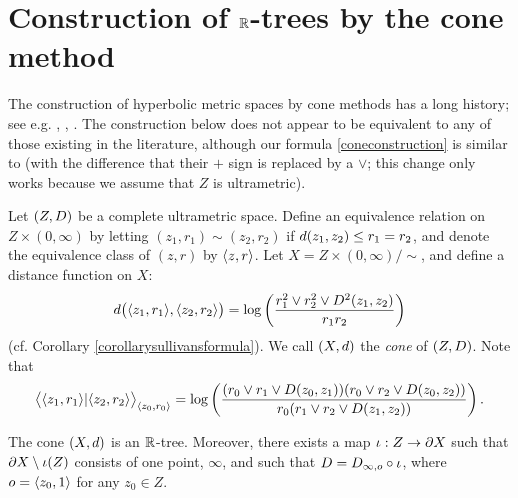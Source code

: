 \section{Construction of $\R$-trees by the cone method}
\label{subsectionconeconstruction}
The construction of hyperbolic metric spaces by cone methods has a long history; see e.g. \cite[1.8.A.(b)]{Gromov3}, \cite{TrotsenkoVaisala}, \cite[]{BonkSchramm}. The construction below does not appear to be equivalent to any of those existing in the literature, although our formula \eqref{coneconstruction} is similar to \cite[7.1]{BonkSchramm} (with the difference that their $+$ sign is replaced by a $\vee$; this change only works because we assume that $Z$ is ultrametric).

Let $(Z,D)$ be a complete ultrametric space. Define an equivalence relation on $Z\times (0,\infty)$ by letting $(z_1,r_1) \sim (z_2,r_2)$ if $d(z_1,z_2)\leq r_1 = r_2$, and denote the equivalence class of $(z,r)$ by $\langle z,r\rangle$. Let $X = Z\times (0,\infty)/\sim$, and define a distance function on $X$:
\begin{equation}
\label{coneconstruction}
d\big(\langle z_1,r_1\rangle,\langle z_2,r_2\rangle\big) = \log\left(\frac{r_1^2\vee r_2^2\vee D^2(z_1,z_2)}{r_1 r_2}\right)
\end{equation}
(cf. Corollary \ref{corollarysullivansformula}). We call $(X,d)$ the \emph{cone} of $(Z,D)$. Note that
\begin{equation}
\label{coneconstructiongromov}
\big\langle \langle z_1,r_1\rangle | \langle z_2,r_2\rangle\big\rangle_{\langle z_0,r_0\rangle} = \log\left(\frac{(r_0\vee r_1\vee D(z_0,z_1))(r_0\vee r_2\vee D(z_0,z_2))}{r_0(r_1\vee r_2\vee D(z_1,z_2))}\right).
\end{equation}
\begin{theorem}
\label{theoremconeconstruction}
The cone $(X,d)$ is an $\R$-tree. Moreover, there exists a map $\iota:Z\to\partial X$ such that $\partial X\setminus \iota(Z)$ consists of one point, $\infty$, and such that $D = D_{\infty,o}\circ\iota$, where $o = \langle z_0,1\rangle$ for any $z_0\in Z$.
\end{theorem}
